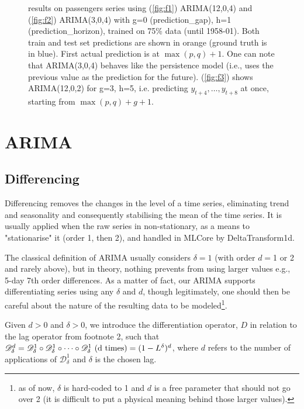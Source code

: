 \documentclass{article}
\begin{document}
\begin{figure}
  \caption{results on passengers series using (\ref{fig:f1}) ARIMA(12,0,4) and (\ref{fig:f2}) ARIMA(3,0,4) with g=0 ({\selectfont prediction\_gap}), h=1 ({\selectfont prediction\_horizon}), trained on 75\% data (until 1958-01). Both train and test set predictions are shown in orange (ground truth is in blue). First actual prediction is at $\max(p,q)+1$. One can note that ARIMA(3,0,4) behaves like the persistence model (i.e., uses the previous value as the prediction for the future). (\ref{fig:f3}) shows ARIMA(12,0,2) for g=3, h=5, i.e. predicting $y_{t+4}, \dots, y_{t+8}$ at once, starting from $\max(p,q)+g+1$.}
  \label{fig:fig1}
\end{figure}



\section{ARIMA}
\subsection{Differencing}
\label{diff}
Differencing removes the changes in the level of a time series, eliminating trend and seasonality and consequently stabilising the mean of the time series. It is usually applied when the raw series in non-stationary, as a means to "stationarise" it (order 1, then 2), and handled in MLCore by {\selectfont DeltaTransform1d}.

The classical definition of ARIMA usually considers $\delta=1$ (with order $d=$1 or 2 and rarely above), but in theory, nothing prevents from using larger values e.g., 5-day 7th order differences. As a matter of fact, our ARIMA supports differentiating series using any $\delta$ and $d$, though legitimately, one should then be careful about the nature of the resulting data to be modeled\footnote{as of now, $\delta$ is hard-coded to 1 and $d$ is a free parameter that should not go over 2 (it is difficult to put a physical meaning behind those larger values).}.

Given $d>0$ and $\delta>0$, we introduce the differentiation operator, $D$ in relation to the lag operator from footnote 2, such that $\mathcal{D}_{\delta}^d=\mathcal{D}_{\delta}^1 \circ \mathcal{D}_{\delta}^1 \circ \dots \circ \mathcal{D}_{\delta}^1 \textmd{ (d times)}= (1-L^{\delta})^d$, where $d$ refers to the number of applications of $\mathcal{D}^1_{\delta}$ and $\delta$ is the chosen lag. \\
\end{document}
